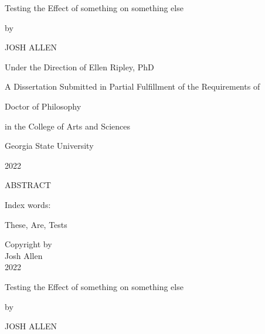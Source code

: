 \documentclass[12pt]{report}
\providecommand{\titlediss}{Testing the Effect of something on something
else}
\renewenvironment{abstract}{
\begin{center}
{ABSTRACT \vspace{0.2in}}
\end{center}
}{}
\begin{document}
\thispagestyle{empty}

\begin{center}
\parbox[]{\textwidth}{\centering\titlediss}
\end{center}
\vspace{0.4in}
\centerline{by}
\vspace*{0.5in}
\centerline{JOSH ALLEN}
\vspace*{0.5in}
\centerline{Under the Direction of Ellen Ripley, PhD}
\vspace{1.0in}



\centerline{A Dissertation Submitted in Partial Fulfillment of the Requirements of }
\centerline{Doctor of Philosophy}
\centerline{in the College of Arts and Sciences}
\centerline{Georgia State University}
\centerline{2022}
\newpage

\newpage

\thispagestyle{empty}

\begin{abstract}




\end{abstract}
\begin{singlespace}
  \vspace{0.5in}
  \noindent Index words: 
  \hspace{0.2in}
  \parbox[t]{4.5in}{These, Are, Tests}
\end{singlespace}

\newpage

\thispagestyle{empty}

\vspace*{0.7\textheight}
\begin{center}
  \parbox[]{\textwidth}{
    \begin{center}
      Copyright by \\
      Josh Allen \\
      2022
    \end{center}}
\end{center}

\newpage


\thispagestyle{empty}



\begin{center}
  \parbox[]{\textwidth}{\centering \titlediss}
  \end{center}

  \vspace*{0.5in}
  \centerline{by}
  \vspace*{0.5in}
  \centerline{JOSH ALLEN}
  \vspace*{1in}
\end{document}

